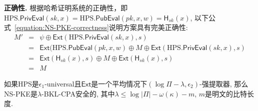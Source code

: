 \begin{trivlist}
\item \textbf{正确性.} 根据哈希证明系统的正确性，即$\text{HPS}.\mathsf{PrivEval}(sk, x)=\text{HPS}.\mathsf{PubEval}(pk, x, w) = \mathsf{H}_{sk}(x)$, 以下公式~\ref{equation:NS-PKE-correctness}说明方案具有完美正确性: 
\begin{eqnarray}\label{equation:NS-PKE-correctness}
	M' &=& \psi\oplus\mathsf{Ext}(\text{HPS}.\mathsf{PrivEval}(sk, x), s) \nonumber\\
        &=& \mathsf{Ext}(\text{HPS}.\mathsf{PubEval}(pk, x, w)\oplus M\oplus\mathsf{Ext}(\text{HPS}.\mathsf{PrivEval}(sk, x), s)\nonumber\\
        &=& \mathsf{Ext}(\mathsf{H}_{sk}(x), s)\oplus M\oplus\mathsf{Ext}(\mathsf{H}_{sk}(x), s)\nonumber\\
        &=& M
\end{eqnarray}
\end{trivlist}

\begin{theorem}\label{theorem:NS-PKE}
如果HPS是$\epsilon_1$-universal且$\mathsf{Ext}$是一个平均情况下$(\log\Pi-\lambda, \epsilon_2)$-强提取器, 那么NS-PKE是$\lambda$-BKL-CPA安全的, 其中$\lambda\leq \log |\Pi|-\omega(\kappa)-m$, $m$是明文的比特长度. 
\end{theorem}

